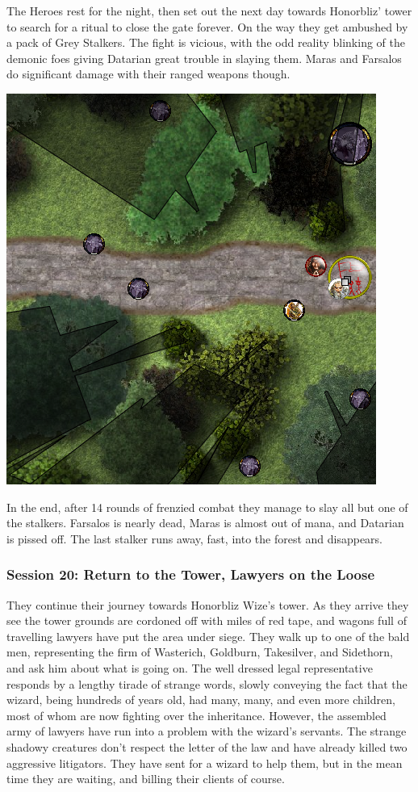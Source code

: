 The Heroes rest for the night, then set out the next day towards Honorbliz' tower to search for a ritual to close the gate forever. On the way they get ambushed by a pack of Grey Stalkers. The fight is vicious, with the odd reality blinking of the demonic foes giving Datarian great trouble in slaying them. Maras and Farsalos do significant damage with their ranged weapons though.

\begin{center}
\vspace{0.5 cm}
\includegraphics[width=0.7\linewidth]{./figs/playthrough/grey-stalkers.png}
\vspace{0.5 cm}
\end{center}

In the end, after 14 rounds of frenzied combat they manage to slay all but one of the stalkers. Farsalos is nearly dead, Maras is almost out of mana, and Datarian is pissed off. The last stalker runs away, fast, into the forest and disappears.


\subsubsection*{Session 20: Return to the Tower, Lawyers on the Loose}
They continue their journey towards Honorbliz Wize's tower. As they arrive they see the tower grounds are cordoned off with miles of red tape, and wagons full of travelling lawyers have put the area under siege. They walk up to one of the bald men, representing the firm of Wasterich, Goldburn, Takesilver, and Sidethorn, and ask him about what is going on. The well dressed legal representative responds by a lengthy tirade of strange words, slowly conveying the fact that the wizard, being hundreds of years old, had many, many, and even more children, most of whom are now fighting over the inheritance. However, the assembled army of lawyers have run into a problem with the wizard's servants. The strange shadowy creatures don't respect the letter of the law and have already killed two aggressive litigators. They have sent for a wizard to help them, but in the mean time they are waiting, and billing their clients of course.

